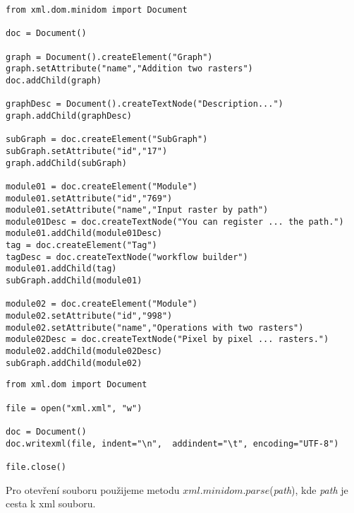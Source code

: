 \newpage
\begin{lstlisting}[label=xml:xml,caption={ukázka tvorby XML dokumentu z [\autoref{xml:example}]}, morekeywords={Document, createElement, setAttribute, createTextNode, addChild}]
from xml.dom.minidom import Document

doc = Document()

graph = Document().createElement("Graph")
graph.setAttribute("name","Addition two rasters")
doc.addChild(graph)

graphDesc = Document().createTextNode("Description...")
graph.addChild(graphDesc)

subGraph = doc.createElement("SubGraph")
subGraph.setAttribute("id","17")
graph.addChild(subGraph)

module01 = doc.createElement("Module")
module01.setAttribute("id","769")
module01.setAttribute("name","Input raster by path")
module01Desc = doc.createTextNode("You can register ... the path.")
module01.addChild(module01Desc)
tag = doc.createElement("Tag")
tagDesc = doc.createTextNode("workflow builder")
module01.addChild(tag)
subGraph.addChild(module01)

module02 = doc.createElement("Module")
module02.setAttribute("id","998")
module02.setAttribute("name","Operations with two rasters")
module02Desc = doc.createTextNode("Pixel by pixel ... rasters.")
module02.addChild(module02Desc)
subGraph.addChild(module02)
\end{lstlisting}

\newpage
\begin{lstlisting}[label=xml:save,caption={uložení XML dokumentu do souboru}]
from xml.dom import Document

file = open("xml.xml", "w")

doc = Document()
doc.writexml(file, indent="\n",  addindent="\t", encoding="UTF-8")

file.close()

\end{lstlisting}

Pro otevření souboru použijeme metodu $xml.minidom.parse$(\textit{path}), kde \textit{path} je cesta k xml souboru.

%


